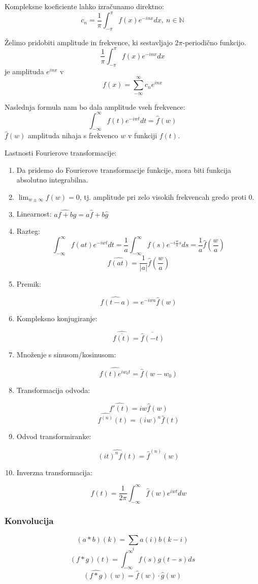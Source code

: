 \documentclass[11pt, a4paper]{article}
\begin{document}
    Kompleksne koeficiente lahko izračunamo direktno:
    \[c_n = \frac{1}{\pi} \int_{- \pi}^{\pi} f(x) e^{-inx} dx,\ n \in \mathbb{N}\]

    Želimo pridobiti amplitude in frekvence, ki sestavljajo \(2\pi\)-periodično funkcijo.
    \[\frac{1}{\pi} \int_{- \pi}^{\pi} f(x) e^{-inx} dx\]
    je amplituda \(e^{inx}\) v 
    \[f(x) = \sum_{- \infty}^{\infty} c_n e^{inx}\]

    Naslednja formula nam bo dala amplitude vseh frekvence:
    \[\int_{- \infty}^{\infty} f(t) e^{-iwt} dt = \hat{f} (w)\]
    \(\hat{f}(w)\) amplituda nihaja s frekvenco \(w\) v funkciji \(f(t)\).

    Lastnosti Fourierove transformacije:
    \begin{enumerate}
        \item Da pridemo do Fourierove transformacije funkcije, mora biti funkcija absolutno integrabilna.
        \item \(\lim_{w \pm \infty} f(w) = 0\), tj. amplitude pri zelo visokih frekvencah gredo proti 0.
        \item Linearnost: \(\hat{af+bg} = a\hat{f}+b\hat{g}\)
        
        \item Razteg: 
        \[\int_{- \infty}^{\infty} f(at) e^{-iwt} dt = \frac{1}{a} \int_{- \infty}^{\infty} f(s) e^{-i \frac{w}{a}s} ds = \frac{1}{a} \hat{f}(\frac{w}{a}) \]
        \[\hat{f(at)} = \frac{1}{|a|} \hat{f}(\frac{w}{a})\]

        \item Premik:
        
        \[ \hat{f(t-a)} = e^{-iwa} \hat{f}(w) \]

        \item Kompleksno konjugiranje:
        
        \[ \hat{\overline{f(t)}} = \overline{\hat{f}(-t)} \]

        \item Množenje s sinusom/kosinusom:
        
        \[ \hat{f(t) e^{iw_0 t}} = \hat{f}(w-w_0) \]

        \item Transformacija odvoda:
        
        \[ \hat{f' (t)} = iw \hat{f}(w) \]
        \[ \hat{f^{(n)}}(t) = (iw)^n \hat{f}(t) \]

        \item Odvod transformiranke:
        
        \[ \hat{(it)^n f(t)} = \hat{f}^{(n)} (w) \]

        \item Inverzna transformacija:
        
        \[ f(t) = \frac{1}{2\pi} \int_{- \infty}^{\infty} \hat{f}(w) e^{iwt} dw \]
        

    \end{enumerate}


    \subsubsection{Konvolucija}

    \[(a \ast b)(k) = \sum_{i} a(i) b(k - i)\]
    \[(f \ast g)(t) = \int_{- \infty}^{\infty} f(s) g(t - s) ds\]
    \[\hat{(f \ast g)}(w) = \hat{f}(w) \cdot \hat{g}(w)\]
\end{document}
